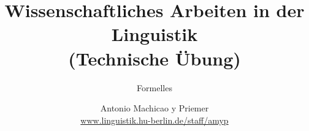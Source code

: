 


\title{
	Wissenschaftliches Arbeiten in der Linguistik\\
	(Technische Übung)
}

\subtitle{Formelles}

\author[aMyP]{
	{\small Antonio Machicao y Priemer}
	\\
	{\footnotesize \url{www.linguistik.hu-berlin.de/staff/amyp}}
}


\date{ }






\begin{frame}
  \HUtitle
\end{frame}





\nocite{Freitag&MyP15a}
\nocite{MyP17c}



%
%
%


